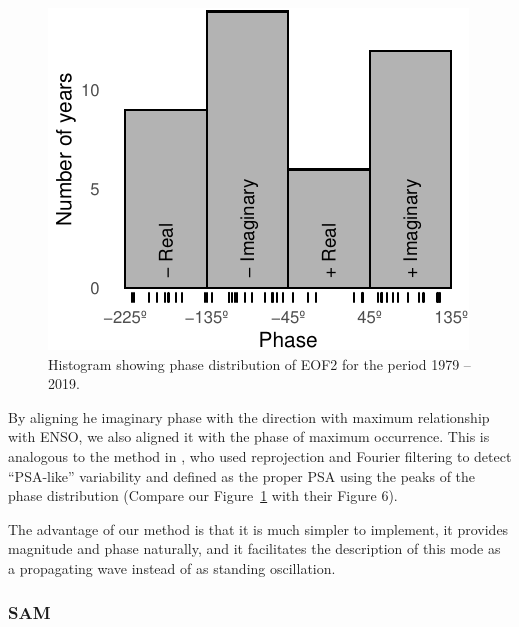 \documentclass[smallextended]{svjour3}       %
\begin{document}
\begin{figure}
\centering
\includegraphics{../figures/phase-histogram-1.pdf}
\caption{\label{fig:phase-histogram}Histogram showing phase distribution of EOF2 for the period 1979 -- 2019.}
\end{figure}

By aligning he imaginary phase with the direction with maximum relationship with ENSO, we also aligned it with the phase of maximum occurrence. This is analogous to the method in \citet{irving2016}, who used reprojection and Fourier filtering to detect ``PSA-like'' variability and defined as the proper PSA using the peaks of the phase distribution (Compare our Figure~\ref{fig:phase-histogram} with their Figure 6).

The advantage of our method is that it is much simpler to implement, it provides magnitude and phase naturally, and it facilitates the description of this mode as a propagating wave instead of as standing oscillation.

\hypertarget{sam}{%
\subsubsection{SAM}\label{sam}}
\end{document}
